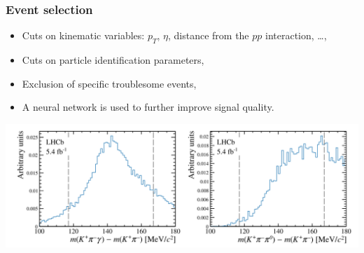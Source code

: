 \documentclass[10pt, aspectratio=169]{beamer}
\begin{document}
\begin{frame}[label=selection]%
  \frametitle{Event selection}

  \begin{itemize}
    \item Cuts on kinematic variables:
      $p_T$, $\eta$, distance from the $pp$ interaction, \ldots,
    \item Cuts on particle identification parameters,
    \item Exclusion of specific troublesome events,
    \item A neural network is used to further improve signal quality.
  \end{itemize}

  \centering \vfill
  \includegraphics[width=.7\linewidth]{figures/conf/B2DKpi-fig002-pointless}

\end{frame}%
\end{document}
